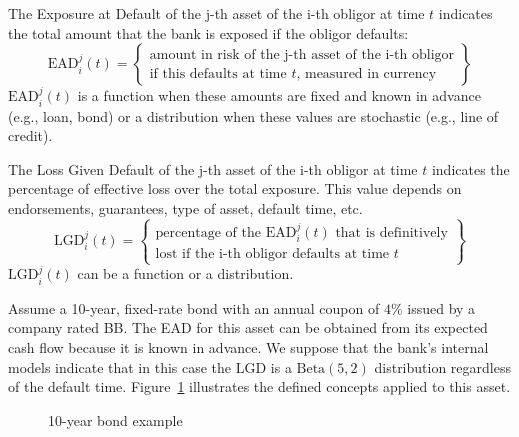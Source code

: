 \documentclass[11pt,fleqn]{book} %
\begin{document}
\begin{definition}
	The Exposure at Default of the j-th asset of the i-th obligor at time $t$
	indicates the total amount that the bank is exposed if the obligor defaults:
	\begin{displaymath}
		\text{EAD}_i^j(t) = \left\{
		\begin{array}{c}
			\text{amount in risk of the j-th asset of the i-th obligor} \\
			\text{if this defaults at time $t$, measured in currency}
		\end{array}
		\right\}
	\end{displaymath}
	$\text{EAD}_i^j(t)$ is a function when these amounts are fixed and known 
	in advance (e.g., loan, bond) or a distribution	when these values are 
	stochastic (e.g., line of credit).
\end{definition}

\begin{definition}
	The Loss Given Default of the j-th asset of the i-th obligor at time $t$ 
	indicates the percentage of effective loss over the total exposure. This
	value depends on endorsements, guarantees, type of asset, default time, etc.
	\begin{displaymath}
		\text{LGD}_i^j(t) = \left\{
		\begin{array}{c}
			\text{percentage of the $\text{EAD}_i^j(t)$ that is definitively} \\
			\text{lost if the i-th obligor defaults at time $t$}
		\end{array}
		\right\}
	\end{displaymath}
	$\text{LGD}_i^j(t)$ can be a function or a distribution.
\end{definition}

\begin{example}
	Assume a 10-year, fixed-rate bond with an annual coupon of $4\%$ issued 
	by a company rated BB\@. The EAD for this asset can be obtained from its 
	expected cash flow because it is known in advance. We suppose that the 
	bank's internal models indicate that in this case the LGD is a 
	$\text{Beta}(5,2)$ distribution regardless of the default time.
	Figure~\ref{figure:bond} illustrates the defined concepts applied 
	to this asset.
\end{example}

\begin{figure}[!ht]
	\centering
	\caption{10-year bond example}
	\label{figure:bond} 
\end{figure}
\end{document}
